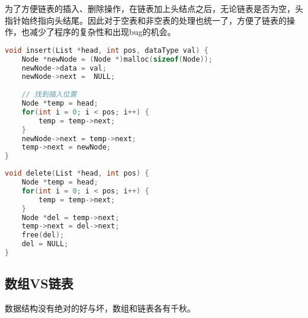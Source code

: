 为了方便链表的插入、删除操作，在链表加上头结点之后，无论链表是否为空，头指针始终指向头结尾。因此对于空表和非空表的处理也统一了，方便了链表的操作，也减少了程序的复杂性和出现bug的机会。 \\


\begin{lstlisting}[language=C]
void insert(List *head, int pos, dataType val) {
    Node *newNode = (Node *)malloc(sizeof(Node));
    newNode->data = val;
    newNode->next =  NULL;
    
    // 找到插入位置
    Node *temp = head;
    for(int i = 0; i < pos; i++) {
        temp = temp->next;
    }
    newNode->next = temp->next;
    temp->next = newNode;
}
\end{lstlisting}

\vspace{0.5cm}


\begin{lstlisting}[language=C]
void delete(List *head, int pos) {
    Node *temp = head;
    for(int i = 0; i < pos; i++) {
        temp = temp->next;
    }
    Node *del = temp->next;
    temp->next = del->next;
    free(del);
    del = NULL;
}
\end{lstlisting}

\subsection{数组VS链表}

数据结构没有绝对的好与坏，数组和链表各有千秋。

